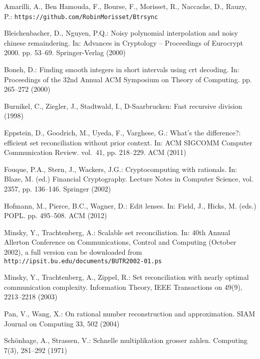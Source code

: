 \documentclass[11pt]{llncs}
\begin{document}
\nocite{rsync}
\nocite{wagner}

\begin{thebibliography}{10}
\providecommand{\url}[1]{\texttt{#1}}
\providecommand{\urlprefix}{URL }

Amarilli, A., {Ben Hamouda}, F., Bourse, F., Morisset, R., Naccache, D., Rauzy,
  P.: \url{https://github.com/RobinMorisset/Btrsync}

Bleichenbacher, D., Nguyen, P.Q.: Noisy polynomial interpolation and noisy
  chinese remaindering. In: Advances in Cryptology -- Proceedings of Eurocrypt
  2000. pp. 53--69. Springer-Verlag (2000)

Boneh, D.: Finding smooth integers in short intervals using crt decoding. In:
  Proceedings of the 32nd Annual ACM Symposium on Theory of Computing. pp.
  265--272 (2000)

Burnikel, C., Ziegler, J., Stadtwald, I., D-Saarbrucken: Fast recursive
  division (1998)

Eppstein, D., Goodrich, M., Uyeda, F., Varghese, G.: What's the difference?:
  efficient set reconciliation without prior context. In: ACM SIGCOMM Computer
  Communication Review. vol.~41, pp. 218--229. ACM (2011)

Fouque, P.A., Stern, J., Wackers, J.G.: Cryptocomputing with rationals. In:
  Blaze, M. (ed.) Financial Cryptography. Lecture Notes in Computer Science,
  vol. 2357, pp. 136--146. Springer (2002)

Hofmann, M., Pierce, B.C., Wagner, D.: Edit lenses. In: Field, J., Hicks, M.
  (eds.) POPL. pp. 495--508. ACM (2012)

Minsky, Y., Trachtenberg, A.: Scalable set reconciliation. In: 40th Annual
  Allerton Conference on Communications, Control and Computing (October 2002),
  a full version can be downloaded from
  \url{http://ipsit.bu.edu/documents/BUTR2002-01.ps}

Minsky, Y., Trachtenberg, A., Zippel, R.: Set reconciliation with nearly
  optimal communication complexity. Information Theory, IEEE Transactions on
  49(9),  2213--2218 (2003)

Pan, V., Wang, X.: On rational number reconstruction and approximation. SIAM
  Journal on Computing  33,  502 (2004)

Sch{\"o}nhage, A., Strassen, V.: Schnelle multiplikation grosser zahlen.
  Computing  7(3),  281--292 (1971)


\end{thebibliography}
\end{document}
